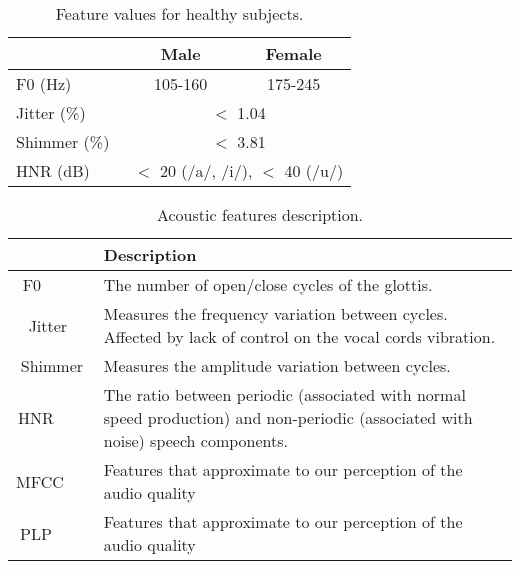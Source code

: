 \documentclass[doublespace,a4paper,11pt,twoside,onecolumn,final,openright]{thesis}
\begin{document}
\begin{table}[!htb]
	\renewcommand{\arraystretch}{1.3} %
	\centering
	\begin{tabular}{lcc}
		\hline
		~       & Male & Female \\ \hline
		F0 (Hz)      & 105-160 & 175-245 \\ 
		Jitter (\%)  & \multicolumn{2}{c}{ $<$ 1.04  } \\ 
		Shimmer (\%) & \multicolumn{2}{c}{ $<$ 3.81 } \\
		HNR (dB)     & \multicolumn{2}{c}{ $<$ 20 (/a/, /i/), $<$ 40 (/u/) } \\
		\hline
	\end{tabular}
	\caption[Feature values for healthy subjects.]{Feature values for healthy subjects.}
	\label{normalValues}
\end{table}

\pagebreak

\begin{table}[!htb]
	\renewcommand{\arraystretch}{1.4} %
	\centering
	\begin{tabular}{cL}
		\hline
		~ & \textbf{Description} \\ \hline
		F0      & The number of open/close cycles of the glottis. \\ 
		Jitter  & Measures the frequency variation between cycles. Affected by lack of control on the vocal cords vibration. \\ 
		Shimmer & Measures the amplitude variation between cycles. \\ 
		HNR     & The ratio between periodic (associated with normal speed production) and non-periodic (associated with noise) speech components. \\ 
		MFCC    & Features that approximate to our perception of the audio quality \\ 
		PLP     & Features that approximate to our perception of the audio quality \\
		\hline
	\end{tabular}
	\caption[Acoustic features description.]{Acoustic features description.}
	\label{featureDescription}
\end{table}

\begin{singlespace}

\def\indexname{Index}             %
\printindex\cleardoublepage

\end{singlespace}
\end{document}
